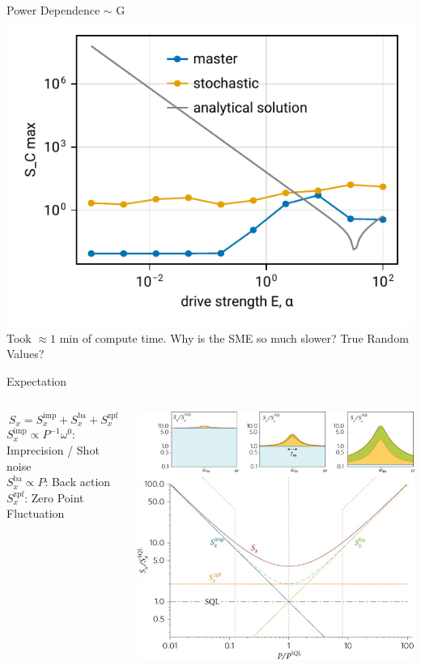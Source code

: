 \documentclass{beamer}
\begin{document}
\begin{frame}{Power Dependence $\sim$ G}
	\includegraphics{figures/02 power.pdf}
	\\\small
	Took $\approx1$ min of compute time. Why is the SME so much slower? True Random Values?
\end{frame}

\begin{frame}{Expectation}
	\begin{columns}
		$$S_x = S_x^\text{imp} + S_x^\text{ba} + S_x^\text{zpf}$$
		\small
		$S_x^\text{imp} \propto P^{-1} \omega^0$: Imprecision / Shot noise\\
		$S_x^\text{ba} \propto P$: Back action\\
		$S_x^\text{zpf}$: Zero Point Fluctuation

		\centering
		\includegraphics[width=\textwidth]{figures/Fig 1.png}
	\end{columns}
\end{frame}
\end{document}
